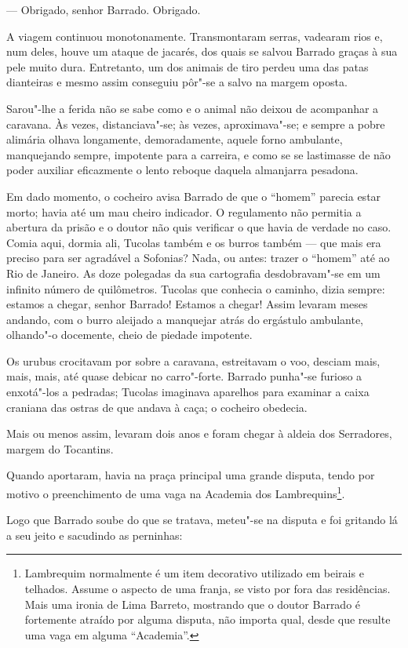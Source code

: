 --- Obrigado, senhor Barrado. Obrigado.

A viagem continuou monotonamente. Transmontaram serras, vadearam rios e,
num deles, houve um ataque de jacarés, dos quais se salvou Barrado
graças à sua pele muito dura. Entretanto, um dos animais de tiro perdeu
uma das patas dianteiras e mesmo assim conseguiu pôr"-se a salvo na
margem oposta.

Sarou"-lhe a ferida não se sabe como e o animal não deixou de acompanhar
a caravana. Às vezes, distanciava"-se; às vezes, aproximava"-se; e sempre
a pobre alimária olhava longamente, demoradamente, aquele forno
ambulante, manquejando sempre, impotente para a carreira, e como se se
lastimasse de não poder auxiliar eficazmente o lento reboque daquela
almanjarra pesadona.

Em dado momento, o cocheiro avisa Barrado de que o ``homem'' parecia
estar morto; havia até um mau cheiro indicador. O regulamento não
permitia a abertura da prisão e o doutor não quis verificar o que havia
de verdade no caso. Comia aqui, dormia ali, Tucolas também e os burros
também --- que mais era preciso para ser agradável a Sofonias? Nada, ou
antes: trazer o ``homem'' até ao Rio de Janeiro. As doze polegadas da
sua cartografia desdobravam"-se em um infinito número de quilômetros.
Tucolas que conhecia o caminho, dizia sempre: estamos a chegar, senhor
Barrado! Estamos a chegar! Assim levaram meses andando, com o burro
aleijado a manquejar atrás do ergástulo ambulante, olhando"-o docemente,
cheio de piedade impotente.

Os urubus crocitavam por sobre a caravana, estreitavam o voo, desciam
mais, mais, mais, até quase debicar no carro"-forte. Barrado punha"-se
furioso a enxotá"-los a pedradas; Tucolas imaginava aparelhos para
examinar a caixa craniana das ostras de que andava à caça; o cocheiro
obedecia.

Mais ou menos assim, levaram dois anos e foram chegar à aldeia dos
Serradores, margem do Tocantins.

Quando aportaram, havia na praça principal uma grande disputa, tendo por
motivo o preenchimento de uma vaga na Academia dos Lambrequins\footnote{Lambrequim
  normalmente é um item decorativo utilizado em beirais e telhados.
  Assume o aspecto de uma franja, se visto por fora das residências.
  Mais uma ironia de Lima Barreto, mostrando que o doutor Barrado é
  fortemente atraído por alguma disputa, não importa qual, desde que
  resulte uma vaga em alguma ``Academia''.}.

Logo que Barrado soube do que se tratava, meteu"-se na disputa e foi
gritando lá a seu jeito e sacudindo as perninhas:

